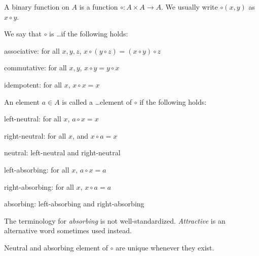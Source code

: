 A binary function on $A$ is a function $\circ: A\times A\to A$.
We usually write $\circ(x,y)$ as $x\circ y$.

\begin{definition}\label{def:math:binop}
We say that $\circ$ is \ldots if the following holds:
\begin{compactitem}
 \item associative: for all $x,y,z$, $x\circ(y\circ z)=(x\circ y)\circ z$
 \item commutative: for all $x,y$, $x\circ y=y\circ x$
 \item idempotent: for all $x$, $x\circ x=x$
\end{compactitem}

An element $a\in A$ is called a \ldots element of $\circ$ if the following holds:
 \begin{compactitem}
  \item left-neutral: for all $x$, $a\circ x=x$
  \item right-neutral: for all $x$, and $x\circ a=x$
  \item neutral: left-neutral and right-neutral
  \item left-absorbing: for all $x$, $a\circ x=a$
  \item right-absorbing: for all $x$, $x\circ a=a$
  \item absorbing: left-absorbing and right-absorbing
 \end{compactitem}
\end{definition}

\begin{terminology}
The terminology for \emph{absorbing} is not well-standardized.
\emph{Attractive} is an alternative word sometimes used instead.
\end{terminology}

\begin{theorem}\label{thm:math:binop}
Neutral and absorbing element of $\circ$ are unique whenever they exist.
\end{theorem}

